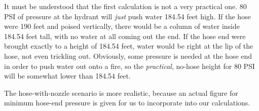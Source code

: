 It must be understood that the first calculation is not a very practical one.  80 PSI of pressure at the hydrant will {\it just} push water 184.54 feet high.  If the hose were 190 feet and poised vertically, there would be a column of water inside 184.54 feet tall, with no water at all coming out the end.  If the hose end were brought exactly to a height of 184.54 feet, water would be right at the lip of the hose, not even trickling out.  Obviously, some pressure is needed at the hose end in order to push water out onto a fire, so the {\it practical}, no-hose height for 80 PSI will be somewhat lower than 184.54 feet.

The hose-with-nozzle scenario is more realistic, because an actual figure for minimum hose-end pressure is given for us to incorporate into our calculations.  










